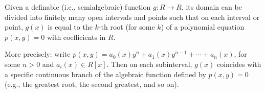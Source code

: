 Given a definable (i.e., semialgebraic) function $g : R \to R$, its domain can be divided into finitely many open intervals and points such that on each interval or point, $g(x)$ is equal to the $k$-th root (for some $k$) of a polynomial equation $p(x, y) = 0$ with coefficients in $R$.

More precisely: write $p(x, y) = a_0(x)y^n + a_1(x)y^{n-1} + \cdots + a_n(x)$, for some $n > 0$ and $a_i(x) \in R[x]$. Then on each subinterval, $g(x)$ coincides with a specific continuous branch of the algebraic function defined by $p(x, y) = 0$ (e.g., the greatest root, the second greatest, and so on).
